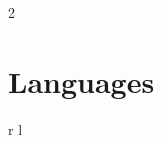 \documentclass[
	10pt, %
]{FreemanCV}
\begin{document}
\begin{paracol}{2}

\section{Languages} 

\begin{supertabular}{r l} %
    
\end{supertabular}
%

\end{paracol} %

\end{document}
